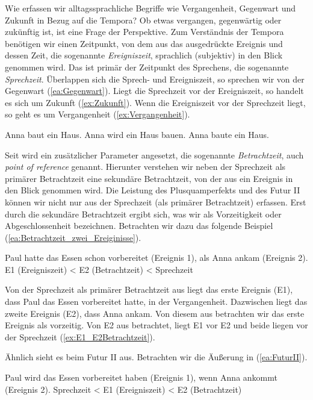 Wie erfassen wir alltagssprachliche Begriffe wie Vergangenheit, Gegenwart und Zukunft in Bezug auf die Tempora? Ob etwas vergangen, gegenwärtig oder zukünftig ist, ist eine Frage der Perspektive. Zum Verständnis der Tempora benötigen wir einen Zeitpunkt, von dem aus das ausgedrückte Ereignis und dessen Zeit, die sogenannte \textit{Ereigniszeit}, sprachlich (subjektiv) in den Blick genommen wird. Das ist primär der Zeitpunkt des Sprechens, die sogenannte \textit{Sprechzeit}. Überlappen sich die Sprech- und Ereigniszeit, so sprechen wir von der Gegenwart (\ref{ea:Gegenwart}). Liegt die Sprechzeit vor der Ereigniszeit, so handelt es sich um Zukunft (\ref{ex:Zukunft}). Wenn die Ereigniszeit vor der Sprechzeit liegt, so geht es um Vergangenheit (\ref{ex:Vergangenheit}).

\ea \label{ea:Zeit}
\ea \label{ea:Gegenwart} Anna baut ein Haus.
\ex \label{ex:Zukunft} Anna wird ein Haus bauen.
\ex \label{ex:Vergangenheit} Anna baute ein Haus.
\z 
\z 

Seit \citet[290]{Reichenbach1947} wird ein zusätzlicher Parameter angesetzt, die sogenannte \textit{Betrachtzeit}, auch \textit{point of reference} genannt. Hierunter verstehen wir neben der Sprechzeit als primärer Betrachtzeit eine sekundäre Betrachtzeit, von der aus ein Ereignis in den Blick genommen wird. Die Leistung des Plusquamperfekts und des Futur II können wir nicht nur aus der Sprechzeit (als primärer Betrachtzeit) erfassen. Erst durch die sekundäre Betrachtzeit ergibt sich, was wir als Vorzeitigkeit oder Abgeschlossenheit bezeichnen. Betrachten wir dazu das folgende Beispiel (\ref{ea:Betrachtzeit_zwei_Ereiginisse}).

\ea \label{ea:Betrachtzeit_zwei_Ereiginisse}
\ea \label{ea:PQF_Prät} Paul hatte das Essen schon vorbereitet (Ereignis 1), als Anna ankam (Ereignis 2).
\ex \label{ex:E1_E2Betrachtzeit} E1 (Ereigniszeit) < E2 (Betrachtzeit) < Sprechzeit
\z 
\z 

Von der Sprechzeit als primärer Betrachtzeit aus liegt das erste Ereignis (E1), dass Paul das Essen vorbereitet hatte, in der Vergangenheit. Dazwischen liegt das zweite Ereignis (E2), dass Anna ankam. Von diesem aus betrachten wir das erste Ereignis als vorzeitig. Von E2 aus betrachtet, liegt E1 vor E2 und beide liegen vor der Sprechzeit (\ref{ex:E1_E2Betrachtzeit}).

Ähnlich sieht es beim Futur II aus. Betrachten wir die Äußerung in (\ref{ea:FuturII}).

\ea \label{ea:FuturII}
\ea \label{ea:FII_Präs} Paul wird das Essen vorbereitet haben (Ereignis 1), wenn Anna ankommt (Ereignis 2).
\ex \label{ex:E1_E2Betrachtzeit_FII} Sprechzeit < E1 (Ereigniszeit) < E2 (Betrachtzeit)
\z 
\z 

